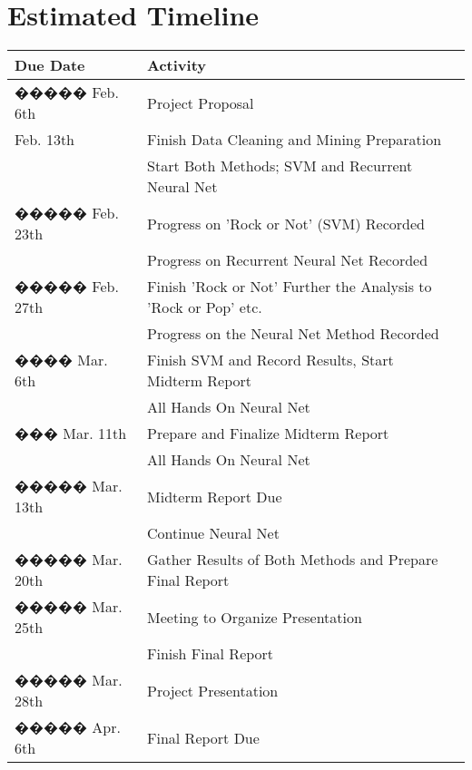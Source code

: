 \documentclass[journal]{IEEEtran}
\begin{document}

\section{Estimated Timeline}

\begin{table}[h!]
  \begin{center}
    \label{tab:table1}
    \begin{tabular}{l|l|l|}
      \textbf{Due Date} & \textbf{Activity}\\

      \hline
����� 	Feb.	6th & Project Proposal\\
	Feb. 13th & Finish Data Cleaning and Mining Preparation\\
	& Start Both Methods; SVM and Recurrent Neural Net\\
 �����	Feb. 	23th & Progress on 'Rock or Not' (SVM) Recorded\\
	& Progress on Recurrent Neural Net Recorded\\
 �����	Feb. 	27th & Finish 'Rock or Not' Further the Analysis to 'Rock or Pop' etc.\\
	& Progress on the Neural Net Method Recorded\\
 ����	Mar. 	6th & Finish SVM and Record Results, Start Midterm Report\\
	& All Hands On Neural Net\\
 ���	Mar. 	11th & Prepare and Finalize Midterm Report\\
	& All Hands On Neural Net\\
 �����	Mar. 	13th & Midterm Report Due \\
	& Continue Neural Net\\
 �����	Mar. 	20th & Gather Results of Both Methods and Prepare Final Report\\
 �����	Mar. 	25th & Meeting to Organize Presentation\\
	& Finish Final Report\\
 �����	Mar. 	28th & Project Presentation\\
 �����	Apr. 	6th & Final Report Due\\

    \end{tabular}
  \end{center}
\end{table}

\end{document}

